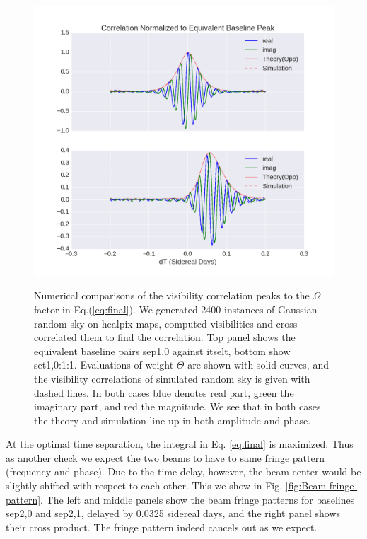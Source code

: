 \documentclass[preprint2,numberedappendix,tighten,twocolappendix]{aastex6}  %
\renewcommand\[{\begin{equation}}
\renewcommand\]{\end{equation}}
\begin{document}
\begin{figure}[H]
\includegraphics[width=\linewidth]{corr}
\label{fig:numerics}
\caption{Numerical comparisons of the visibility correlation peaks to the $\Omega$ factor in Eq.(\ref{eq:final}). We generated 2400 instances of Gaussian random sky on healpix maps, computed visibilities and cross correlated them to find the correlation.  Top panel shows the equivalent baseline pairs sep1,0 against itselt, bottom show set1,0:1:1.  Evaluations of weight $\Theta$ are shown with solid curves, and the visibility correlations of simulated random sky is given with dashed lines. In both cases blue denotes real part, green the imaginary part, and red the magnitude. We see that in both cases the theory and simulation line up in both amplitude and phase.}
\end{figure}


At the optimal time separation, the integral in Eq. \eqref{eq:final}
is maximized. Thus as another check we expect the two beams to have to same fringe pattern
(frequency and phase). Due to the time delay, however, the beam center
would be slightly shifted with respect to each other. This we show
in Fig. \ref{fig:Beam-fringe-pattern}. The left and middle panels show the beam fringe
patterns for baselines sep2,0 and sep2,1, delayed by 0.0325 sidereal days,
and the right panel shows their cross product. The fringe pattern
indeed cancels out as we expect. 
\end{document}
